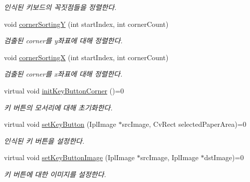 \begin{DoxyCompactItemize}
\begin{DoxyCompactList}\small\item\em 인식된 키보드의 꼭짓점들을 정렬한다. \end{DoxyCompactList}\item 
\hypertarget{class_fk_paper_keyboard_ab0b9df01217586881c883721f915a808}{}void \hyperlink{class_fk_paper_keyboard_ab0b9df01217586881c883721f915a808}{corner\+Sorting\+Y} (int start\+Index, int corner\+Count)\label{class_fk_paper_keyboard_ab0b9df01217586881c883721f915a808}

\begin{DoxyCompactList}\small\item\em 검출된 corner를 y좌표에 대해 정렬한다. \end{DoxyCompactList}\item 
\hypertarget{class_fk_paper_keyboard_ae3a50117e94d97acdb05e955e8f70f65}{}void \hyperlink{class_fk_paper_keyboard_ae3a50117e94d97acdb05e955e8f70f65}{corner\+Sorting\+X} (int start\+Index, int corner\+Count)\label{class_fk_paper_keyboard_ae3a50117e94d97acdb05e955e8f70f65}

\begin{DoxyCompactList}\small\item\em 검출된 corner를 x좌표에 대해 정렬한다. \end{DoxyCompactList}\item 
\hypertarget{class_fk_paper_keyboard_ae3f081c1255181fa2207be3d11027962}{}virtual void \hyperlink{class_fk_paper_keyboard_ae3f081c1255181fa2207be3d11027962}{init\+Key\+Button\+Corner} ()=0\label{class_fk_paper_keyboard_ae3f081c1255181fa2207be3d11027962}

\begin{DoxyCompactList}\small\item\em 키 버튼의 모서리에 대해 초기화한다. \end{DoxyCompactList}\item 
\hypertarget{class_fk_paper_keyboard_a7a17942327f49654b9ba96dc2260a2e6}{}virtual void \hyperlink{class_fk_paper_keyboard_a7a17942327f49654b9ba96dc2260a2e6}{set\+Key\+Button} (Ipl\+Image $\ast$src\+Image, Cv\+Rect selected\+Paper\+Area)=0\label{class_fk_paper_keyboard_a7a17942327f49654b9ba96dc2260a2e6}

\begin{DoxyCompactList}\small\item\em 인식된 키 버튼을 설정한다. \end{DoxyCompactList}\item 
\hypertarget{class_fk_paper_keyboard_a5d1e23caf5d957f759c46c7cfc78a522}{}virtual void \hyperlink{class_fk_paper_keyboard_a5d1e23caf5d957f759c46c7cfc78a522}{set\+Key\+Button\+Image} (Ipl\+Image $\ast$src\+Image, Ipl\+Image $\ast$dst\+Image)=0\label{class_fk_paper_keyboard_a5d1e23caf5d957f759c46c7cfc78a522}

\begin{DoxyCompactList}\small\item\em 키 버튼에 대한 이미지를 설정한다. \end{DoxyCompactList}\end{DoxyCompactItemize}
